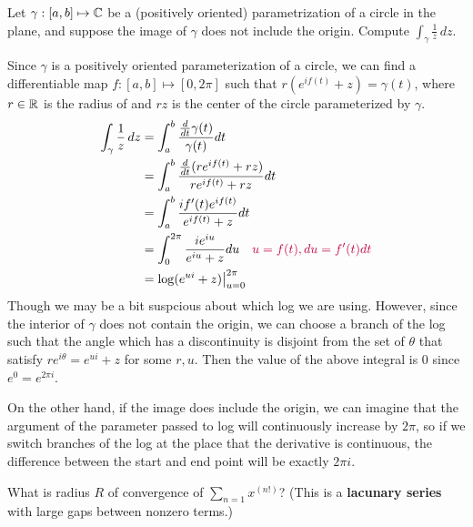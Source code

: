 \documentclass{homework}
\begin{document}
                      \begin{problem}\label{one-over-z-around-circle}Let $\gamma:[a, b]\mapsto \mathbb{C}$ be a (positively oriented) parametrization of a circle
                        in the plane, and suppose the image of $\gamma$ does not include the
                          origin.  Compute $\displaystyle\int_\gamma \frac{1}{z} \, dz$.
                          \end{problem}
                          \begin{solution}
                          Since $\gamma$ is a positively oriented parameterization of a circle, we can find a differentiable map $f:[a,b]\mapsto [0, 2\pi]$ such that $r(e^{if(t)} + z)= \gamma(t)$, where $r\in\mathbb{R}$ is the radius of and $rz$ is the center of the circle parameterized by $\gamma$.
                          \begin{align*}
                          \int_\gamma \frac{1}{z} \, dz &= \int_a^{b} \frac{\frac{d}{dt}\gamma(t)}{\gamma(t)}dt\\
                          &= \int_a^{b} \frac{\frac{d}{dt}(re^{if(t)}+ rz)}{re^{if(t)} + rz}dt\\
                          &= \int_a^{b} \frac{if'(t)e^{if(t)}}{e^{if(t)} + z}dt\\
                          &= \int_0^{2\pi} \frac{ie^{iu}}{e^{iu} +  z}du \quad \color{purple} u=f(t), du = f'(t) dt\\
                          &= \log(e^{ui} + z)\big|_{u=0}^{2\pi}
                          \end{align*}
                          Though we may be a bit suspcious about which log we are using. However, since the interior of $\gamma$ does not contain the origin, we can choose a branch of the log such that the angle which has a discontinuity is disjoint from the set of $\theta$ that satisfy $re^{i\theta}= e^{ui} +z$ for some $r, u$. Then the value of the above integral is 0 since $e^0 = e^{2\pi i}$.

                          On the other hand, if the image does include the origin, we can imagine that the argument of the parameter passed to log will continuously increase by $2\pi$, so if we switch branches of the log at the place that the derivative is continuous, the difference between the start and end point will be exactly $2\pi i$.

                          \end{solution}
                          \begin{problem}\label{lacunary-series}What is radius $R$ of convergence of
                            $\displaystyle\sum_{n=1} x^{(n!)}$?  (This is a \textbf{lacunary
                                series} with large gaps between nonzero terms.)
                                \end{problem}
\end{document}
